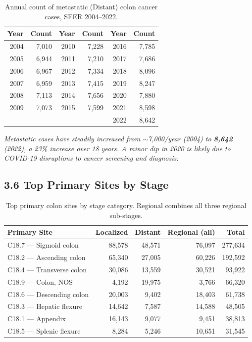 \documentclass[11pt, a4paper]{article}
\begin{document}
\begin{table}[H]
\centering
\renewcommand{\arraystretch}{1.3}
\begin{tabular}{rr|rr|rr}
\toprule
\textbf{Year} & \textbf{Count} & \textbf{Year} & \textbf{Count} & \textbf{Year} & \textbf{Count} \\
\midrule
2004 & 7,010 & 2010 & 7,228 & 2016 & 7,785 \\
2005 & 6,944 & 2011 & 7,210 & 2017 & 7,686 \\
2006 & 6,967 & 2012 & 7,334 & 2018 & 8,096 \\
2007 & 6,959 & 2013 & 7,415 & 2019 & 8,247 \\
2008 & 7,113 & 2014 & 7,656 & 2020 & 7,880 \\
2009 & 7,073 & 2015 & 7,599 & 2021 & 8,598 \\
     &       &      &       & 2022 & 8,642 \\
\bottomrule
\end{tabular}
\caption{Annual count of metastatic (Distant) colon cancer cases, SEER 2004--2022.}
\end{table}

\noindent\textit{Metastatic cases have steadily increased from $\sim$7,000/year (2004) to \textbf{8,642} (2022), a 23\% increase over 18 years. A minor dip in 2020 is likely due to COVID-19 disruptions to cancer screening and diagnosis.}

\vspace{6pt}

\subsection*{3.6 Top Primary Sites by Stage}

\begin{table}[H]
\centering
\small
\renewcommand{\arraystretch}{1.3}
\begin{tabular}{lrrrr}
\toprule
\textbf{Primary Site} & \textbf{Localized} & \textbf{Distant} & \textbf{Regional (all)} & \textbf{Total} \\
\midrule
C18.7 --- Sigmoid colon         & 88,578 & 48,571 &  76,097 & 277,634 \\
C18.2 --- Ascending colon       & 65,340 & 27,005 &  60,226 & 192,592 \\
C18.4 --- Transverse colon      & 30,086 & 13,559 &  30,521 &  93,922 \\
C18.9 --- Colon, NOS            &  4,192 & 19,975 &   3,766 &  66,320 \\
C18.6 --- Descending colon      & 20,003 &  9,402 &  18,403 &  61,738 \\
C18.3 --- Hepatic flexure       & 14,642 &  7,587 &  14,588 &  48,505 \\
C18.1 --- Appendix              & 16,143 &  9,077 &   9,451 &  38,813 \\
C18.5 --- Splenic flexure       &  8,284 &  5,246 &  10,651 &  31,545 \\
\bottomrule
\end{tabular}
\caption{Top primary colon sites by stage category. Regional combines all three regional sub-stages.}
\end{table}
\end{document}
